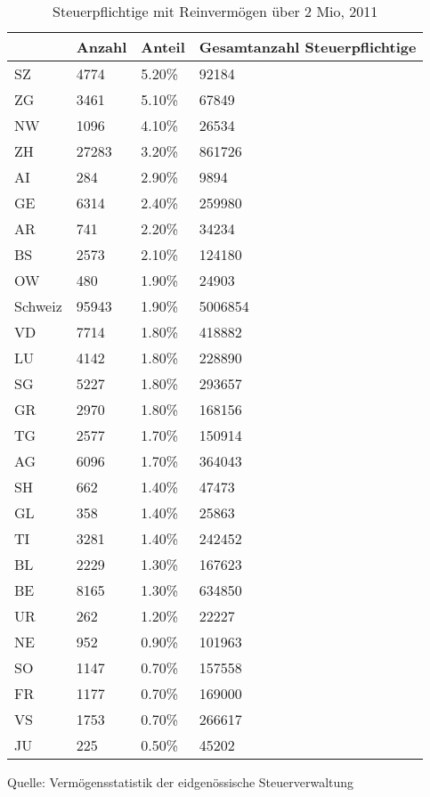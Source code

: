 \documentclass[a4paper, 12pt,liststotoc]{scrartcl}
\numberwithin{equation}{section}
\begin{document}
\begin{table}
\centering
\footnotesize
\caption{Steuerpflichtige mit Reinvermögen über 2 Mio, 2011}
\begin{tabular}{L{2.5cm}L{3cm}L{3cm}L{4cm}}
\toprule
~ & Anzahl & Anteil & Gesamtanzahl Steuerpflichtige\\
\midrule
SZ & 4774 & 5.20\% & 92184\\
ZG & 3461 & 5.10\% & 67849\\
NW & 1096 & 4.10\% & 26534\\
ZH & 27283 & 3.20\% & 861726\\
AI & 284 & 2.90\% & 9894\\
GE & 6314 & 2.40\% & 259980\\
AR & 741 & 2.20\% & 34234\\
BS & 2573 & 2.10\% & 124180\\
OW & 480 & 1.90\% & 24903\\
\midrule
Schweiz & 95943 & 1.90\% &
5006854\\
\midrule
VD & 7714 & 1.80\% & 418882\\
LU & 4142 & 1.80\% & 228890\\
SG & 5227 & 1.80\% & 293657\\
GR & 2970 & 1.80\% & 168156\\
TG & 2577 & 1.70\% & 150914\\
AG & 6096 & 1.70\% & 364043\\
SH & 662 & 1.40\% & 47473\\
GL & 358 & 1.40\% & 25863\\
TI & 3281 & 1.40\% & 242452\\
BL & 2229 & 1.30\% & 167623\\
\midrule
BE & 8165 & 1.30\% &
634850\\
\midrule
UR & 262 & 1.20\% & 22227\\
NE & 952 & 0.90\% & 101963\\
SO & 1147 & 0.70\% & 157558\\
FR & 1177 & 0.70\% & 169000\\
VS & 1753 & 0.70\% & 266617\\
JU & 225 & 0.50\% & 45202\\
\bottomrule
\end{tabular}
\begin{tablenotes}
      \small
      \item Quelle: Vermögensstatistik der eidgenössische Steuerverwaltung
    \end{tablenotes}
\label{tab:steuerpflichtige}

\end{table}

\printbibliography[heading=bibintoc]
\end{document}
